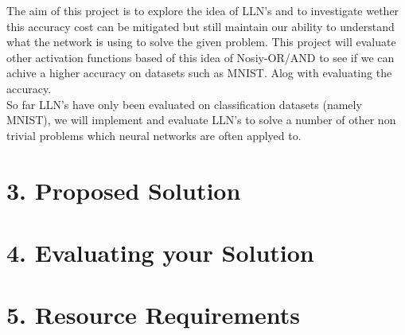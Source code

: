 \documentclass[11pt, a4paper, twoside, openright]{report}
\begin{document}
The aim of this project is to explore the idea of LLN's and to investigate wether this accuracy cost can be mitigated but still maintain our ability to understand what the network is using to solve the given problem. This project will evaluate other activation functions based of this idea of Nosiy-OR/AND to see if we can achive a higher accuracy on datasets such as MNIST. Alog with evaluating the accuracy.\\

So far LLN's have only been evaluated on classification datasets (namely MNIST), we will implement and evaluate LLN's to solve a number of other non trivial problems which neural networks are often applyed to.

\section*{3. Proposed Solution}


\section*{4. Evaluating your Solution}


\section*{5. Resource Requirements}


\backmatter

%


\end{document}
